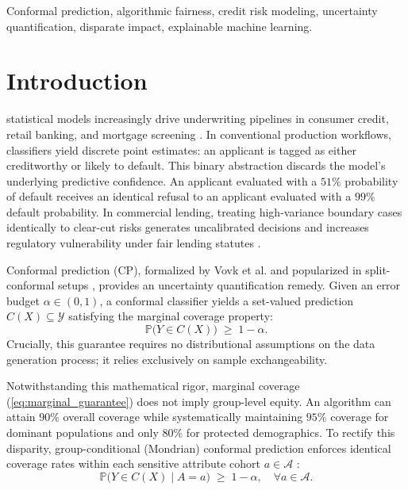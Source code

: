 \documentclass[conference]{IEEEtran}
\begin{document}
\begin{IEEEkeywords}
Conformal prediction, algorithmic fairness, credit risk modeling, uncertainty quantification, disparate impact, explainable machine learning.
\end{IEEEkeywords}

\section{Introduction}
 statistical models increasingly drive underwriting pipelines in consumer credit, retail banking, and mortgage screening \cite{barocas2023fairness}. In conventional production workflows, classifiers yield discrete point estimates: an applicant is tagged as either creditworthy or likely to default. This binary abstraction discards the model's underlying predictive confidence. An applicant evaluated with a $51\%$ probability of default receives an identical refusal to an applicant evaluated with a $99\%$ default probability. In commercial lending, treating high-variance boundary cases identically to clear-cut risks generates uncalibrated decisions and increases regulatory vulnerability under fair lending statutes \cite{hardt2016equality}.

Conformal prediction (CP), formalized by Vovk et al. \cite{vovk2005algorithmic} and popularized in split-conformal setups \cite{lei2018distribution, romano2020classification, angelopoulos2021gentle}, provides an uncertainty quantification remedy. Given an error budget $\alpha \in (0, 1)$, a conformal classifier yields a set-valued prediction $C(X) \subseteq \mathcal{Y}$ satisfying the marginal coverage property:
\begin{equation}
\label{eq:marginal_guarantee}
\mathbb{P}\bigl(Y \in C(X)\bigr) \;\ge\; 1 - \alpha.
\end{equation}
Crucially, this guarantee requires no distributional assumptions on the data generation process; it relies exclusively on sample exchangeability.

Notwithstanding this mathematical rigor, marginal coverage (\ref{eq:marginal_guarantee}) does not imply group-level equity. An algorithm can attain $90\%$ overall coverage while systematically maintaining $95\%$ coverage for dominant populations and only $80\%$ for protected demographics. To rectify this disparity, group-conditional (Mondrian) conformal prediction enforces identical coverage rates within each sensitive attribute cohort $a \in \mathcal{A}$ \cite{romano2020classification}:
\begin{equation}
\label{eq:group_guarantee}
\mathbb{P}\bigl(Y \in C(X) \mid A = a\bigr) \;\ge\; 1 - \alpha, \quad \forall a \in \mathcal{A}.
\end{equation}
\end{document}
